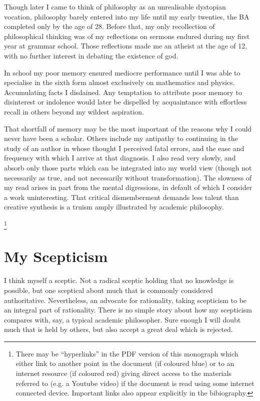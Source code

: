 \documentclass[10pt,titlepage]{book}
\begin{document}
Though later I came to think of philosophy as an unrealisable dystopian vocation, philosophy barely entered into my life until my early twenties, the BA completed only by the age of 28.
Before that, my only recollection of philosophical thinking was of my reflections on sermons endured during my first year at grammar school.
Those reflections made me an atheist at the age of 12, with no further interest in debating the existence of god.

In school my poor memory ensured mediocre performance until I was able to specialise in the sixth form almost exclusively on mathematics and physics.
Accumulating facts I disdained.
Any temptation to attribute poor memory to disinterest or indolence would later be dispelled by acquaintance with effortless recall in others beyond my wildest aspiration.

That shortfall of memory may be the most important of the reasons why I could never have been a scholar.
Others include my antipathy to continuing in the study of an author in whose thought I perceived fatal errors, and the ease and frequency with which I arrive at that diagnosis.
I also read very slowly, and absorb only those parts which can be integrated into my world view (though not necessarily as true, and not necessarily without transformation).
The slowness of my read arises in part from the mental digressions, in default of which I consider a work uninteresting.
That critical dismemberment demands less talent than creative synthesis is a truism amply illustrated by academic philosophy.

\footnote{There may be ``hyperlinks'' in the PDF version of this monograph which either link to another point in the document  (if coloured blue) or to an internet resource  (if coloured red) giving direct access to the materials referred to (e.g. a Youtube video) if the document is read using some internet connected device.
  Important links also appear explicitly in the bibiography.}

\section{My Scepticism}

I think myself a sceptic.
Not a radical sceptic holding that no knowledge is possible, but one sceptical about much that is commonly considered authoritative.
Nevertheless, an advocate for rationality, taking scepticism to be an integral part of rationality.
There is no simple story about how my scepticism compares with, say, a typical academic philosopher.
Sure enough I will doubt much that is held by others, but also accept a great deal which is rejected.
\end{document}
